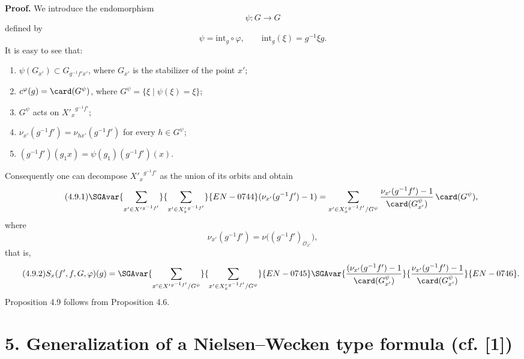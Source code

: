 \medskip
\noindent
\textbf{Proof.} We introduce the endomorphism
\[
\psi:G\longrightarrow G
\]
defined by
\[
\psi=\mathrm{int}_g\circ\varphi,
\qquad \mathrm{int}_g(\xi)=g^{-1}\xi g.
\]
It is easy to see that:
\begin{enumerate}
\item[i)] $\psi(G_{x'})\subset G_{g^{-1}f'x'}$, where $G_{x'}$ is the stabilizer of the point $x'$;
\item[ii)] $c^\varphi(g)=\card(G^\psi)$, where $G^\psi=\{\xi\mid\psi(\xi)=\xi\}$;
\item[iii)] $G^\psi$ acts on ${X'_x}^{g^{-1}f'}$;
\item[iv)] $\nu_{x'}(g^{-1}f')=\nu_{hx'}(g^{-1}f')$ for every $h\in G^\psi$;
\item[v)] $(g^{-1}f')(g_1x)=\psi(g_1)(g^{-1}f')(x)$.
\end{enumerate}
Consequently one can decompose ${X'_x}^{g^{-1}f'}$ as the union of its orbits and obtain
\begin{equation}\tag{4.9.1}
\SGAvar{\sum_{x'\in {X'}^{g^{-1}f'}}}{\sum_{x'\in {X'_x}^{g^{-1}f'}}}{EN-0744}(\nu_{x'}(g^{-1}f')-1)
=
\sum_{x'\in {X'_x}^{g^{-1}f'}/G^\psi}
\frac{\nu_{x'}(g^{-1}f')-1}{\card(G^\psi_{x'})}\,\card(G^\psi),
\end{equation}
where
\[
\nu_{x'}(g^{-1}f')=\nu\bigl((g^{-1}f')_{\mathcal O_{x'}}\bigr),
\]
that is,
\begin{equation}\tag{4.9.2}
S_x(f',f,G,\varphi)(g)=\SGAvar{\sum_{x'\in {X'}^{g^{-1}f'}/G^\psi}}{\sum_{x'\in {X'_x}^{g^{-1}f'}/G^\psi}}{EN-0745}
\SGAvar{\frac{(\nu_{x'}(g^{-1}f')-1}{\card(G^\psi_{x'})}}{\frac{\nu_{x'}(g^{-1}f')-1}{\card(G^\psi_{x'})}}{EN-0746}.
\end{equation}
Proposition 4.9 follows from Proposition 4.6.

\section*{5. Generalization of a Nielsen--Wecken type formula {\normalfont (cf. [1])}}

